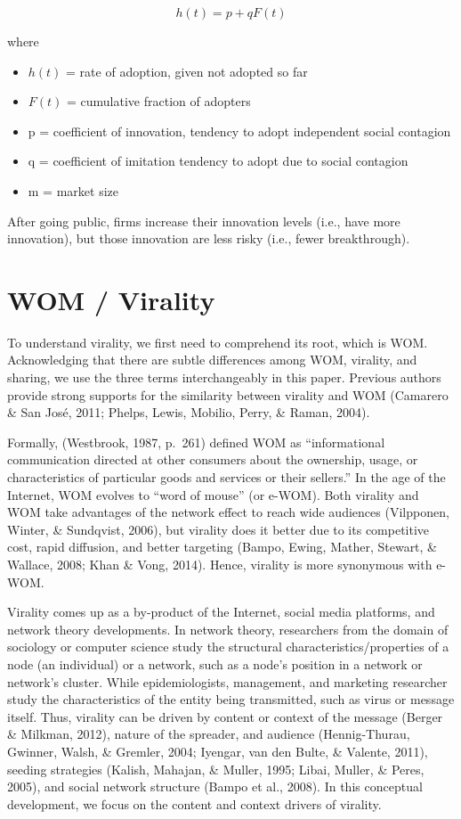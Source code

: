 \documentclass[
]{book}
\begin{document}
\[
h(t) = p + qF(t)
\]

where

\begin{itemize}
\item
  \(h(t)\) = rate of adoption, given not adopted so far
\item
  \(F(t)\) = cumulative fraction of adopters
\item
  p = coefficient of innovation, tendency to adopt independent social contagion
\item
  q = coefficient of imitation tendency to adopt due to social contagion
\item
  m = market size
\end{itemize}

After going public, firms increase their innovation levels (i.e., have more innovation), but those innovation are less risky (i.e., fewer breakthrough). \citep{Wies_2015}

\hypertarget{wom-virality}{%
\chapter{WOM / Virality}\label{wom-virality}}

To understand virality, we first need to comprehend its root, which is WOM. Acknowledging that there are subtle differences among WOM, virality, and sharing, we use the three terms interchangeably in this paper. Previous authors provide strong supports for the similarity between virality and WOM (Camarero \& San José, 2011; Phelps, Lewis, Mobilio, Perry, \& Raman, 2004).

Formally, (Westbrook, 1987, p.~261) defined WOM as ``informational communication directed at other consumers about the ownership, usage, or characteristics of particular goods and services or their sellers.'' In the age of the Internet, WOM evolves to ``word of mouse'' (or e-WOM). Both virality and WOM take advantages of the network effect to reach wide audiences (Vilpponen, Winter, \& Sundqvist, 2006), but virality does it better due to its competitive cost, rapid diffusion, and better targeting (Bampo, Ewing, Mather, Stewart, \& Wallace, 2008; Khan \& Vong, 2014). Hence, virality is more synonymous with e-WOM.

Virality comes up as a by-product of the Internet, social media platforms, and network theory developments. In network theory, researchers from the domain of sociology or computer science study the structural characteristics/properties of a node (an individual) or a network, such as a node's position in a network or network's cluster. While epidemiologists, management, and marketing researcher study the characteristics of the entity being transmitted, such as virus or message itself. Thus, virality can be driven by content or context of the message (Berger \& Milkman, 2012), nature of the spreader, and audience (Hennig-Thurau, Gwinner, Walsh, \& Gremler, 2004; Iyengar, van den Bulte, \& Valente, 2011), seeding strategies (Kalish, Mahajan, \& Muller, 1995; Libai, Muller, \& Peres, 2005), and social network structure (Bampo et al., 2008). In this conceptual development, we focus on the content and context drivers of virality.
\end{document}

